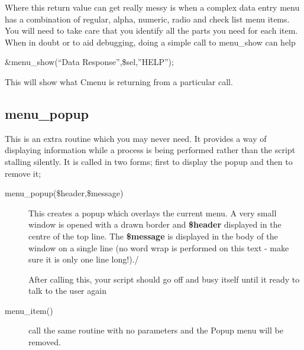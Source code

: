 \documentclass[a4paper,abstracton]{article}
\begin{document}
Where this return value can get really messy is when a complex data entry menu has a combination of regular, alpha, numeric, radio and check list menu items. You will need to take care that you identify all the parts you need for each item. When in doubt or to aid debugging, doing a simple call to menu\_show can help
\begin{center}
\&menu\_show(``Data Response'',\$sel,''HELP'');
\end{center}
This will show what Cmenu is returning from a particular call.

\subsection{menu\_popup}
This is an extra routine which you may never need. It provides a way of displaying information while a process is being performed rather than the script stalling silently. It is called in two forms; first to display the popup and then to remove it;
\begin{description}
\item [menu\_popup(\$header,\$message)] This creates a popup which overlays the current menu. A very small window is opened with a drawn border and \textbf{\$header} displayed in the centre of the top line. The \textbf{\$message} is displayed in the body of the window on a single line (no word wrap is performed on this text - make sure it is only one line long!)./

After calling this, your script should go off and busy itself until it ready to talk to the user again
\item [menu\_item()] call the same routine with no parameters and the Popup menu will be removed.
\end{description}
\end{document}
